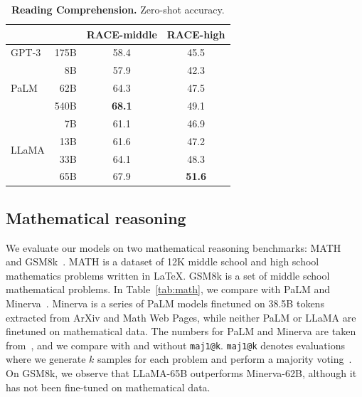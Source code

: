\documentclass[11pt]{article}
\newcommand{\tbf}{\textbf}
\newcommand{\model}{LLaMA\xspace}
\begin{document}
\begin{table}[t]
  \center
  \begin{tabular}{@{}lrcc@{}}
  \toprule
  & & RACE-middle & RACE-high \\
  \midrule
  GPT-3  & 175B & 58.4 & 45.5 \\
  \midrule
  \multirow{3}{*}{PaLM}
         & 8B   & 57.9 & 42.3 \\
         & 62B  & 64.3 & 47.5 \\
         & 540B & \tbf{68.1} & 49.1 \\
  \midrule
  \multirow{4}{*}{\model}
         & 7B & 61.1 & 46.9 \\
         & 13B  & 61.6 & 47.2 \\
         & 33B  & 64.1 & 48.3 \\
         & 65B  & 67.9 & \tbf{51.6}    \\
  \bottomrule
  \end{tabular}
  \caption{
  \textbf{Reading Comprehension.} Zero-shot accuracy.
  \label{tab:readingcomprehension}
  }
\end{table}

\subsection{Mathematical reasoning}

We evaluate our models on two mathematical reasoning benchmarks: MATH~\cite{hendrycks2021measuring} and GSM8k~\cite{cobbe2021training}.
MATH is a dataset of 12K middle school and high school mathematics problems written in LaTeX.
GSM8k is a set of middle school mathematical problems.
In Table~\ref{tab:math}, we compare with PaLM and Minerva~\cite{lewkowycz2022solving}.
Minerva is a series of PaLM models finetuned on 38.5B tokens extracted from ArXiv and Math Web Pages, while neither PaLM or \model are finetuned on mathematical data.
The numbers for PaLM and Minerva are taken from~\citet{lewkowycz2022solving}, and we compare with and without \texttt{maj1@k}.
\texttt{maj1@k} denotes evaluations where we generate $k$ samples for each problem and perform a majority voting~\cite{wang2022Self}.
On GSM8k, we observe that \model-65B outperforms Minerva-62B, although it has not been fine-tuned on mathematical data.
\end{document}
